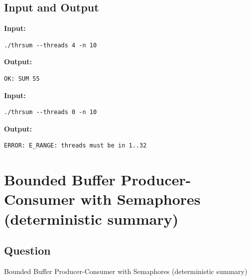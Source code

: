 \documentclass[12pt,a4paper]{article}
\begin{document}
\subsection{Input and Output}
\noindent\textbf{Input:}
\begin{verbatim}
./thrsum --threads 4 -n 10 
\end{verbatim}
\vspace{0.5cm}
\noindent\textbf{Output:}
\begin{verbatim}
OK: SUM 55

\end{verbatim}
\noindent\textbf{Input:}
\begin{verbatim}
./thrsum --threads 0 -n 10

\end{verbatim}
\vspace{0.5cm}
\noindent\textbf{Output:}
\begin{verbatim}
ERROR: E_RANGE: threads must be in 1..32

\end{verbatim}
\newpage
\section{Bounded Buffer Producer-Consumer with Semaphores
(deterministic summary)}
\subsection{Question}
Bounded Buffer Producer-Consumer with Semaphores
(deterministic summary)
\end{document}
